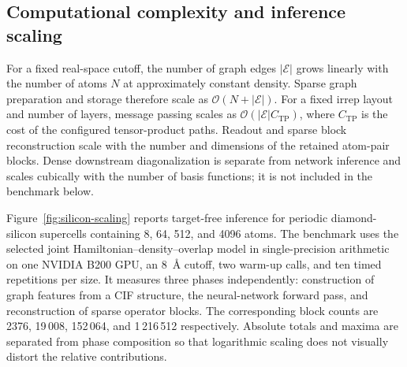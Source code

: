 \documentclass[preprint,12pt,compress,numafflabel]{elsarticle}
\begin{document}
\subsection{Computational complexity and inference scaling}
\label{subsec:performance}

For a fixed real-space cutoff, the number of graph edges $|\mathcal{E}|$ grows linearly with the number of atoms $N$ at approximately constant density. Sparse graph preparation and storage therefore scale as $\mathcal{O}(N+|\mathcal{E}|)$. For a fixed irrep layout and number of layers, message passing scales as $\mathcal{O}(|\mathcal{E}|C_{\mathrm{TP}})$, where $C_{\mathrm{TP}}$ is the cost of the configured tensor-product paths. Readout and sparse block reconstruction scale with the number and dimensions of the retained atom-pair blocks. Dense downstream diagonalization is separate from network inference and scales cubically with the number of basis functions; it is not included in the benchmark below.

Figure~\ref{fig:silicon-scaling} reports target-free inference for periodic diamond-silicon supercells containing 8, 64, 512, and 4096 atoms. The benchmark uses the selected joint Hamiltonian--density--overlap model in single-precision arithmetic on one NVIDIA B200 GPU, an 8~\r{A} cutoff, two warm-up calls, and ten timed repetitions per size. It measures three phases independently: construction of graph features from a CIF structure, the neural-network forward pass, and reconstruction of sparse operator blocks. The corresponding block counts are 2376, 19\,008, 152\,064, and 1\,216\,512 respectively. Absolute totals and maxima are separated from phase composition so that logarithmic scaling does not visually distort the relative contributions.
\end{document}

